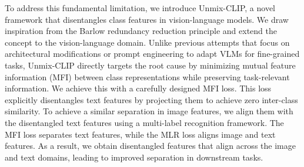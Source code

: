 To address this fundamental limitation, we introduce Unmix-CLIP, a novel framework that disentangles class features in vision-language models. We draw inspiration from the Barlow redundancy reduction principle \cite{barlow} and extend the concept to the vision-language domain. Unlike previous attempts that focus on architectural modifications \cite{clip_surgery,gem_walid} or prompt engineering \cite{dualcoop,PositiveCoOp} to adapt VLMs for fine-grained tasks, Unmix-CLIP directly targets the root cause by minimizing mutual feature information (MFI) between class representations while preserving task-relevant information. We achieve this with a carefully designed MFI loss. This loss explicitly disentangles text features by projecting them to achieve zero inter-class similarity. To achieve a similar separation in image features, we align them with the disentangled text features using a multi-label recognition framework. The MFI loss separates text features, while the MLR loss aligns image and text features. As a result, we obtain disentangled features that align across the image and text domains, leading to improved separation in downstream tasks.

%  


